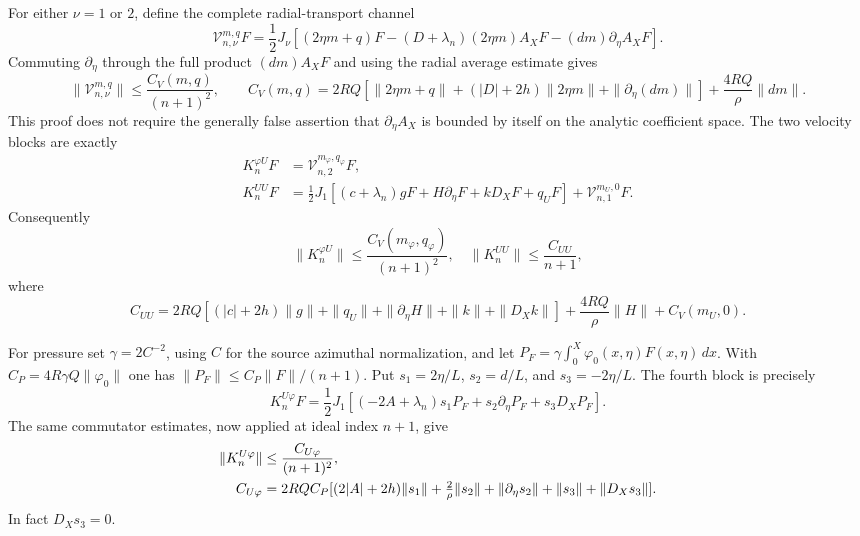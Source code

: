 For either $\nu=1$ or $2$, define the complete radial-transport
channel
\[
 \mathcal V_{n,\nu}^{m,q}F=\frac12J_\nu
 [(2\eta m+q)F-(D+\lambda_n)(2\eta m)A_XF
 -(dm)\partial_\eta A_XF].
\]
Commuting $\partial_\eta$ through the full product $(dm)A_XF$
and using the radial average estimate gives
\begin{equation}\label{eq:CV}
 \|\mathcal V_{n,\nu}^{m,q}\|\le\frac{C_V(m,q)}{(n+1)^2},\qquad
 C_V(m,q)=2RQ[\|2\eta m+q\|+
 (|D|+2h)\|2\eta m\|+\|\partial_\eta(dm)\|]
 +\frac{4RQ}{\rho}\|dm\|.
\end{equation}
This proof does not require the generally false assertion that
$\partial_\eta A_X$ is bounded by itself on the analytic coefficient
space. The two velocity blocks are exactly
\begin{align}
 K_n^{\varphi U}F&=\mathcal V_{n,2}^{m_\varphi,q_\varphi}F,
 \label{eq:offphi}\\
 K_n^{UU}F&=\frac12 J_1[(c+\lambda_n)gF+H\partial_\eta F+
 kD_XF+q_UF]+\mathcal V_{n,1}^{m_U,0}F.
 \label{eq:uu}
\end{align}
Consequently
\[
 \|K_n^{\varphi U}\|\le\frac{C_V(m_\varphi,q_\varphi)}
 {(n+1)^2},\quad
 \|K_n^{UU}\|\le\frac{C_{UU}}{n+1},
\]
where
\[
 C_{UU}=2RQ[(|c|+2h)\|g\|+\|q_U\|+
 \|\partial_\eta H\|+\|k\|+\|D_Xk\|]
 +\frac{4RQ}{\rho}\|H\|+C_V(m_U,0).
\]

For pressure set $\gamma=2C^{-2}$, using $C$ for the source
azimuthal normalization, and let
$P_F=\gamma\int_0^X\varphi_0(x,\eta)F(x,\eta)\,dx$.
With $C_P=4R\gamma Q\|\varphi_0\|$ one has
$\|P_F\|\le C_P\|F\|/(n+1)$. Put
$s_1=2\eta/L$, $s_2=d/L$, and $s_3=-2\eta/L$.
The fourth block is precisely
\[
 K_n^{U\varphi}F=\frac12J_1[
 (-2A+\lambda_n)s_1P_F+s_2\partial_\eta P_F+s_3D_XP_F].
\]
The same commutator estimates, now applied at ideal index $n+1$,
give
\begin{align}
 \|K_n^{U\varphi}\|&\le\frac{C_{U\varphi}}{(n+1)^2},
 \label{eq:offpress}\\
 C_{U\varphi}&=2RQC_P[
 (2|A|+2h)\|s_1\|+\tfrac{2}{\rho}\|s_2\|
 +\|\partial_\eta s_2\|+\|s_3\|+\|D_Xs_3\|].\notag
\end{align}
In fact $D_Xs_3=0$.

